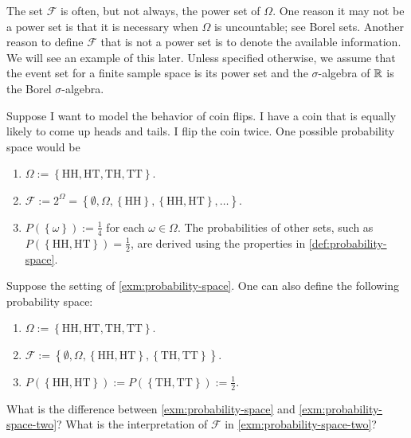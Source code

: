 \documentclass[letterpaper,11pt]{article}
\begin{document}
The set $\mathcal{F}$ is often, but not always, the power set of $\Omega$. One reason it may not be a power set is that it is necessary when $\Omega$ is uncountable; see Borel sets. Another reason to define $\mathcal{F}$ that is not a power set is to denote the available information. We will see an example of this later. Unless specified otherwise, we assume that the event set for a finite sample space is its power set and the $\sigma$-algebra of $\mathbb{R}$ is the Borel $\sigma$-algebra.

\begin{example} \label{exm:probability-space}
 Suppose I want to model the behavior of coin flips. I have a coin that is equally likely to come up heads and tails. I flip the coin twice. One possible probability space would be
  \begin{enumerate}
  \item $\Omega := \left\{ \mathrm{HH}, \mathrm{HT}, \mathrm{TH}, \mathrm{TT} \right\}$.
  \item $\mathcal{F} := 2^{\Omega } = \left\{ \emptyset, \Omega, \left\{ \mathrm{HH} \right\}, \left\{ \mathrm{HH}, \mathrm{HT} \right\}, \dots  \right\}$.
  \item $P(\left\{ \omega \right\}) := \frac{1}{4}$ for each $\omega \in \Omega$. The probabilities of other sets, such as $P(\left\{ \mathrm{HH}, \mathrm{HT} \right\}) = \frac{1}{2}$, are derived using the properties in \cref{def:probability-space}.
  \end{enumerate}
\end{example}


\begin{example} \label{exm:probability-space-two}
Suppose the setting of \cref{exm:probability-space}. One can also define the following probability space:
  \begin{enumerate}
  \item $\Omega := \left\{ \mathrm{HH}, \mathrm{HT}, \mathrm{TH}, \mathrm{TT} \right\}$.
  \item $\mathcal{F} := \left\{ \emptyset, \Omega, \left\{ \mathrm{HH}, \mathrm{HT} \right\}, \left\{ \mathrm{TH}, \mathrm{TT} \right\}  \right\}$.
  \item $P(\left\{ \mathrm{HH}, \mathrm{HT} \right\}) := P(\left\{ \mathrm{TH}, \mathrm{TT} \right\}) := \frac{1}{2}$. 
  \end{enumerate}
\end{example}

\begin{question}
What is the difference between \cref{exm:probability-space} and \cref{exm:probability-space-two}? What is the interpretation of $\mathcal{F}$ in \cref{exm:probability-space-two}? 
\end{question}
\end{document}
